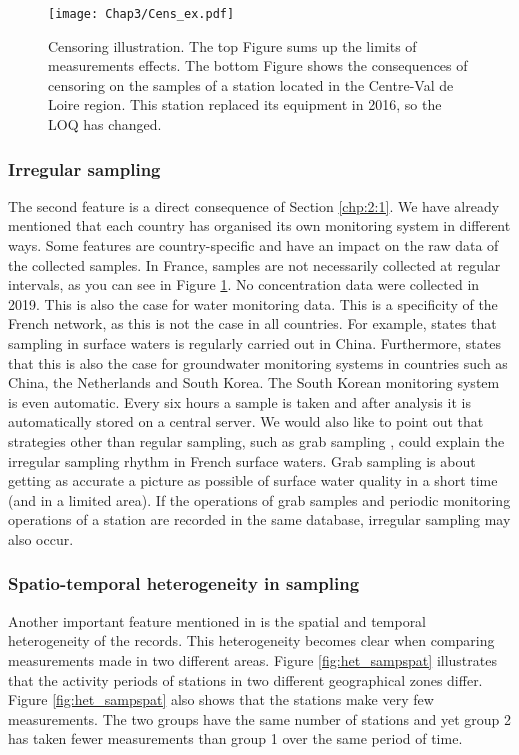 \begin{figure}
    \centering
    \texttt{[image: Chap3/Cens\_ex.pdf]}
    \caption{Censoring illustration. The top Figure sums up the limits of measurements effects. The bottom Figure shows the consequences of censoring on the samples of a station located in the Centre-Val de Loire region. This station replaced its equipment in 2016, so the LOQ has changed.}
    \label{fig:cens_ex}
\end{figure}

\subsubsection{Irregular sampling}

The second feature is a direct consequence of Section \ref{chp:2:1}. We have already mentioned that each country has organised its own monitoring system in different ways. Some features are country-specific and have an impact on the raw data of the collected samples. In France, samples are not necessarily collected at regular intervals, as you can see in Figure \ref{fig:cens_ex}. No concentration data were collected in 2019. This is also the case for water monitoring data. This is a specificity of the French network, as this is not the case in all countries. For example, \cite{Zhang2008} states that sampling in surface waters is regularly carried out in China. Furthermore, \cite{Joergensen2008} states that this is also the case for groundwater monitoring systems in countries such as China, the Netherlands and South Korea. The South Korean monitoring system is even automatic. Every six hours a sample is taken and after analysis it is automatically stored on a central server. We would also like to point out that strategies other than regular sampling, such as grab sampling \citep{Novic2017}, could explain the irregular sampling rhythm in French surface waters. Grab sampling is about getting as accurate a picture as possible of surface water quality in a short time (and in a limited area). If the operations of grab samples and periodic monitoring operations of a station are recorded in the same database, irregular sampling may also occur.

\subsubsection{Spatio-temporal heterogeneity in sampling}

Another important feature mentioned in \cite{Baran2022} is the spatial and temporal heterogeneity of the records. This heterogeneity becomes clear when comparing measurements made in two different areas. Figure \ref{fig:het_sampspat} illustrates that the activity periods of stations in two different geographical zones differ. Figure \ref{fig:het_sampspat} also shows that the stations make very few measurements. The two groups have the same number of stations and yet group 2 has taken fewer measurements than group 1 over the same period of time.

